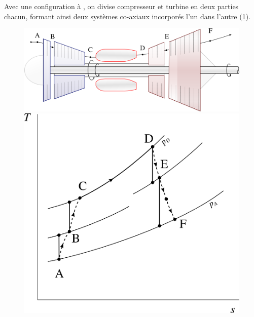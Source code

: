 		Avec une configuration à , on divise compresseur et turbine en deux parties chacun, formant ainsi deux systèmes co-axiaux incorporés l’un dans l’autre (\cref{fig_axes_multiples}).

		\begin{figure}
			\begin{center}
				\includegraphics[scale=0.6]{images/circuit_twin_spool.png}\vspace{0.5cm}
				\includegraphics[scale=0.6]{images/ts_gp_twin_spool.png}
			\end{center}
			\label{fig_axes_multiples}
		\end{figure}

